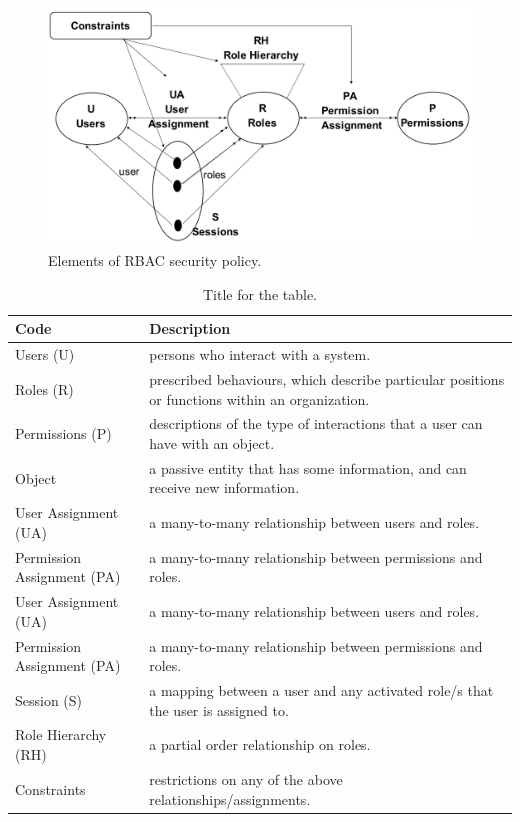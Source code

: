 \begin{figure}[bht]
\centering
\includegraphics[scale=0.26]{RBACElements.png}
\caption{Elements of RBAC security policy.}
\label{fig:elelmRBAC}
\end{figure}


\begin{table}[bth]
\centering
\caption{Title for the table.}
\small
{}
\begin{tabular}{p{1.6 in} p{5.2 in}} \hline 
\hline
Code & Description\\\hline

Users (U)&  persons who interact with a system.\\
Roles (R)& prescribed behaviours, which describe particular positions or functions within an organization. \\
Permissions (P)& descriptions of the type of interactions that a user can have with an object.\\
Object& a passive entity that has some information, and   can receive new information.\\
User Assignment (UA)& a many-to-many relationship   between users and roles.\\
Permission Assignment (PA)& a many-to-many relationship between permissions and roles.\\
User Assignment (UA)&a many-to-many relationship between users and roles.\\
 Permission Assignment (PA)& a many-to-many relationship between permissions and roles.\\
Session (S)& a mapping between a user and any activated role/s that the user is assigned to.\\
Role Hierarchy (RH)& a partial order relationship on roles.\\
Constraints&restrictions on any of the above relationships/assignments.  \\ \hline\hline

\end{tabular}
\label{tab:namehere}


\end{table}
